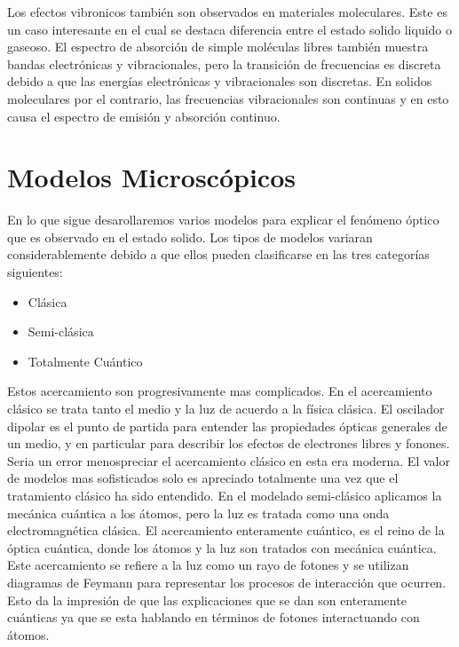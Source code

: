 \documentclass[a4paper,openright,12pt]{book}
\begin{document}
Los efectos vibronicos también son observados en materiales moleculares. Este es un caso interesante en el cual se destaca diferencia entre el estado solido liquido o gaseoso. El espectro de absorción de simple moléculas libres también muestra bandas electrónicas y vibracionales, pero la transición de frecuencias es discreta debido a que las energías electrónicas y vibracionales son discretas. En solidos moleculares por el contrario, las frecuencias vibracionales son continuas y en esto causa el espectro de emisión y absorción continuo.


\section{Modelos Microscópicos}
En lo que sigue desarollaremos varios modelos para explicar el fenómeno óptico que es observado en el estado solido. Los tipos de modelos variaran considerablemente debido a que ellos pueden clasificarse en las tres categorías siguientes:
\begin{itemize}
\item Clásica
\item Semi-clásica
\item Totalmente Cuántico
\end{itemize}

Estos acercamiento son progresivamente mas complicados. En el acercamiento clásico se trata tanto el medio y la luz de acuerdo a la física clásica. El oscilador dipolar es el punto de partida para entender las propiedades ópticas generales de un medio, y en particular para describir los efectos de electrones libres y fonones. Seria un error menospreciar el acercamiento clásico  en esta era moderna. El valor de modelos mas sofisticados solo es apreciado totalmente una vez que el tratamiento clásico ha sido entendido. En el modelado semi-clásico aplicamos la mecánica cuántica a los átomos, pero la luz es tratada como una onda electromagnética clásica. El acercamiento enteramente cuántico, es el reino de la óptica cuántica, donde los átomos y la luz son tratados con mecánica cuántica. Este acercamiento se refiere a la luz como un rayo de fotones y se utilizan diagramas de Feymann para representar los procesos de interacción que ocurren. Esto da la impresión de que las explicaciones que se dan son enteramente cuánticas ya que se esta hablando en términos de fotones interactuando con átomos.
\end{document}
